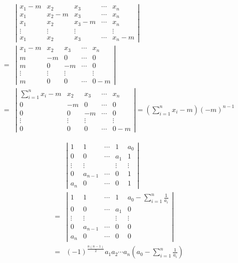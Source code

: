 \documentclass[13pt,fontset=mac, mathserif]{ctexbeamer}
\begin{document}
\begin{frame}
	\small{
\begin{align*}
& 	\left|\begin{array}{ccccc}
		x_{1}-m & x_{2} & x_{3} & \cdots & x_{n} \\
		x_{1} & x_{2}-m & x_{3} & \cdots & x_{n} \\
		x_{1} & x_{2} & x_{3}-m & \cdots & x_{n} \\
		\vdots & \vdots & \vdots & & \vdots \\
		x_{1} & x_{2} & x_{3} & \cdots & x_{n}-m
	\end{array}\right|\\[-3pt]
= & \left|\begin{array}{ccccc}
		x_{1}-m & x_{2} & x_{3} & \cdots & x_{n} \\
		m & -m & 0 & \cdots & 0 \\
		m & 0 & -m & \cdots & 0 \\
		\vdots & \vdots & \vdots & & \vdots \\
		m & 0 & 0 & \cdots & 0-m
	\end{array}\right|\\[-3pt]
 = & \left|\begin{array}{ccccc}
		\sum_{i=1}^{n} x_{i}-m & x_{2} & x_{3} & \cdots & x_{n} \\
		0 & -m & 0 & \cdots & 0 \\
		0 & 0 & -m & \cdots & 0 \\
		\vdots & \vdots & \vdots & & \vdots \\
		0 & 0 & 0 & \cdots & 0-m
	\end{array}\right|=\left(\sum_{i=1}^{n} x_{i}-m\right)(-m)^{n-1}
\end{align*}}
\end{frame}

\begin{frame}
\begin{align*}
& 	\left|\begin{array}{ccccc}
		1 & 1 & \cdots & 1 & a_{0} \\
		0 & 0 & \cdots & a_{1} & 1 \\
		\vdots & \vdots & & \vdots & \vdots \\
		0 & a_{n-1} & \cdots & 0 & 1 \\
		a_{n} & 0 & \cdots & 0 & 1
	\end{array}\right| \\[8pt]
= & \left|\begin{array}{ccccc}
		1 & 1 & \cdots & 1 & a_{0}-\sum_{i=1}^{n} \frac{1}{a_{i}} \\
		0 & 0 & \cdots & a_{1} & 0 \\
		\vdots & \vdots & & \vdots & \vdots \\
		0 & a_{n-1} & \cdots & 0 & 0 \\
		a_{n} & 0 & \cdots & 0 & 0
	\end{array}\right|  \\[8pt]
= & (-1)^{\frac{n(n-1)}{2}} a_{1} a_{2} \cdots a_{n}\left(a_{0}-\sum_{i=1}^{n} \frac{1}{a_{i}}\right)
\end{align*}
\end{frame}
\end{document}
